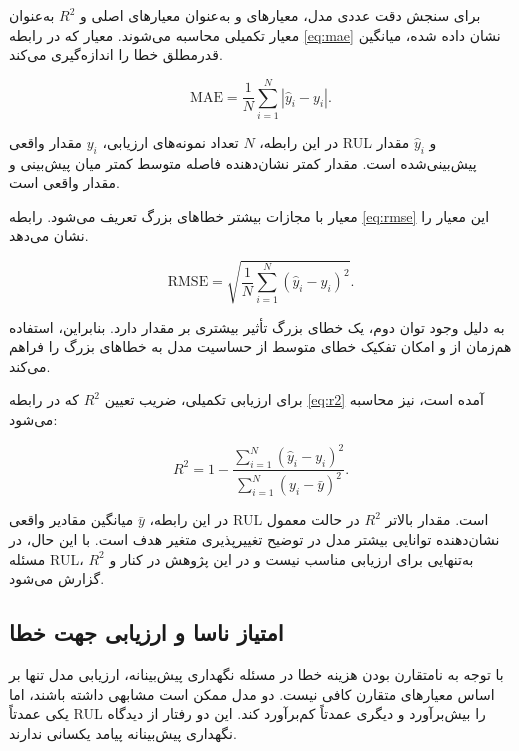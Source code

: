 برای سنجش دقت عددی مدل، معیارهای  و  به‌عنوان
معیارهای اصلی و $R^2$ به‌عنوان معیار تکمیلی محاسبه می‌شوند.
معیار  که در رابطه \ref{eq:mae} نشان داده شده، میانگین قدرمطلق خطا را اندازه‌گیری می‌کند.

\begin{equation}
	\label{eq:mae}
	\mathrm{MAE}
	=
	\frac{1}{N}
	\sum_{i=1}^{N}
	\left|
	\hat{y}_i-y_i
	\right|.
\end{equation}

در این رابطه، $N$ تعداد نمونه‌های ارزیابی، $y_i$ مقدار واقعی
\gls{RUL} و $\hat{y}_i$ مقدار پیش‌بینی‌شده است. مقدار کمتر
 نشان‌دهنده فاصله متوسط کمتر میان پیش‌بینی و مقدار واقعی
است.

معیار  با مجازات بیشتر خطاهای بزرگ تعریف می‌شود. رابطه \ref{eq:rmse} این معیار را نشان می‌دهد.

\begin{equation}
	\label{eq:rmse}
	\mathrm{RMSE}
	=
	\sqrt{
		\frac{1}{N}
		\sum_{i=1}^{N}
		(\hat{y}_i-y_i)^2
	}.
\end{equation}

به دلیل وجود توان دوم، یک خطای بزرگ تأثیر بیشتری بر مقدار
 دارد. بنابراین، استفاده هم‌زمان از 
  و
امکان تفکیک خطای متوسط از حساسیت مدل به خطاهای بزرگ را
فراهم می‌کند.

برای ارزیابی تکمیلی، ضریب تعیین $R^2$ که در رابطه 
\ref{eq:r2}
آمده است، نیز محاسبه می‌شود:

\begin{equation}
	\label{eq:r2}
	R^2
	=
	1-
	\frac{
		\sum_{i=1}^{N}
		(\hat{y}_i-y_i)^2
	}{
		\sum_{i=1}^{N}
		(y_i-\bar{y})^2
	}.
\end{equation}

در این رابطه، $\bar{y}$ میانگین مقادیر واقعی \gls{RUL} است.
مقدار بالاتر $R^2$ در حالت معمول نشان‌دهنده توانایی بیشتر مدل در
توضیح تغییرپذیری متغیر هدف است. با این حال، در مسئله
\gls{RUL}،
 $R^2$
  به‌تنهایی برای ارزیابی مناسب نیست و در این
پژوهش در کنار  و  گزارش می‌شود.

\subsection{امتیاز ناسا و ارزیابی جهت خطا}
\label{sec:nasa-score}

با توجه به نامتقارن بودن هزینه خطا در مسئله نگهداری پیش‌بینانه،
ارزیابی مدل تنها بر اساس معیارهای متقارن کافی نیست. دو مدل ممکن
است  مشابهی داشته باشند، اما یکی عمدتاً \gls{RUL} را
بیش‌برآورد و دیگری عمدتاً کم‌برآورد کند. این دو رفتار از دیدگاه
نگهداری پیش‌بینانه پیامد یکسانی ندارند.

